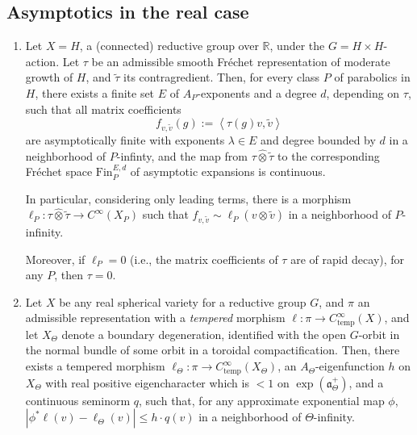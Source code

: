 \subsection{Asymptotics in the real case}
\label{subsection-asymptotics-real}

\begin{theorem}
 \label{theorem-asymptotics-real}
\begin{enumerate}
 \item Let $X=H$, a (connected) reductive group over $\mathbb R$, under the $G=H\times H$-action. Let $\tau$ be an admissible smooth Fr\'echet representation of moderate growth of $H$, and $\tilde\tau$ its contragredient. Then, for every class $P$ of parabolics in $H$, there exists a finite set $E$ of $A_P$-exponents and a degree $d$, depending on $\tau$, such that all matrix coefficients
 $$ f_{v,\tilde v}(g):=\left< \tau(g) v, \tilde v\right>$$
 are asymptotically finite with exponents $\lambda \in E$ and degree bounded by $d$ in a neighborhood of $P$-infinty, and the map from $\tau\hat\otimes\tilde\tau$ to the corresponding Fr\'echet space $\text{Fin}_P^{E,d}$ of asymptotic expansions is continuous.
 
 In particular, considering only leading terms, there is a morphism $\ell_P:\tau\hat\otimes\tilde\tau \to C^\infty(X_P)$ such that $f_{v,\tilde v} \sim \ell_P(v\otimes\tilde v)$ in a neighborhood of $P$-infinity.
 
 Moreover, if $\ell_P=0$ (i.e., the matrix coefficients of $\tau$ are of rapid decay), for any $P$, then $\tau=0$.
 
 \item Let $X$ be any real spherical variety for a reductive group $G$, and $\pi$ an admissible representation with a \emph{tempered} morphism $\ell: \pi \to C^\infty_{\text{temp}}(X)$, and let $X_\Theta$ denote a boundary degeneration, identified with the open $G$-orbit in the normal bundle of some orbit in a toroidal compactification. Then, there exists a tempered morphism $\ell_\Theta: \pi \to C^\infty_{\text{temp}}(X_\Theta)$, an $A_\Theta$-eigenfunction $h$ on $X_\Theta$ with real positive eigencharacter which is $<1$ on $\exp(\mathfrak a_\Theta^+)$, and a continuous seminorm $q$, such that, for any approximate exponential map $\phi$, $|\phi^* \ell(v) - \ell_\Theta(v)| \le  h\cdot q(v)$ in a neighborhood of $\Theta$-infinity. 
\end{enumerate}

\end{theorem}


